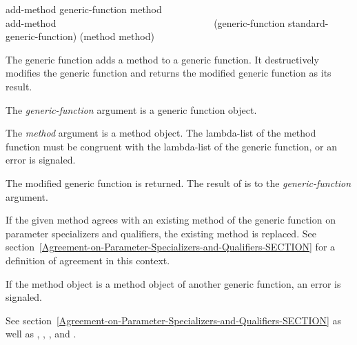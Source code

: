 \begin{defun}
add-method generic-function method \\
add-method~~~~~~~~~~~~~~~~~~~~~~~~~~~~~~~~ (generic-function standard-generic-function) (method method)

The generic function  adds a method to a generic
function.  It destructively modifies the generic function and returns
the modified generic function as its result.


The {\it generic-function\/} argument is a generic function
object.

The {\it method\/} argument is a method object.  The lambda-list of
the method function must be congruent with the lambda-list of the
generic function, or an error is signaled.


The modified generic function is returned.  The result of  
is  to the {\it generic-function\/} argument.


If the given method agrees with an existing method of the generic
function on parameter specializers and qualifiers, the existing method
is replaced.  See section~\ref{Agreement-on-Parameter-Specializers-and-Qualifiers-SECTION}
for a definition of agreement in this context.

If the method object is a method object of another generic function,
an error is signaled.

See section~\ref{Agreement-on-Parameter-Specializers-and-Qualifiers-SECTION}
as well as
,
,
,
and .
\end{defun}


